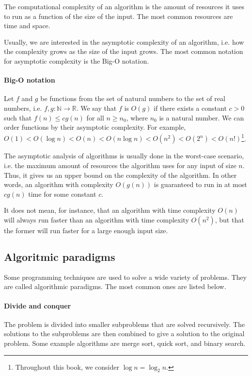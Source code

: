 The computational complexity of an algorithm is the amount of resources it uses to
run as a function of the size of the input.  The most common resources are time and
space.

Usually, we are interested in the asymptotic complexity of an algorithm, i.e. how
the complexity grows as the size of the input grows.  The most common notation for
asymptotic complexity is the Big-O notation.

\paragraph{Big-O notation}  Let $f$ and $g$ be functions from the set of natural numbers
to the set of real numbers, i.e. $f, g : \mathbb{N} \rightarrow \mathbb{R}$.  We say that $f$ is
$O(g)$ if there exists a constant $c > 0$ such that $f(n) \leq c g(n)$ for all $n \geq
n_0$, where $n_0$ is a natural number.
We can order functions by their asymptotic complexity.  For example, $O(1) < O(\log n) <
O(n) < O(n \log n) < O(n^2) < O(2^n) < O(n!)$\footnote{Throughout this book, we consider
$\log n = \log_2 n$.}.

The asymptotic analysis of algorithms is usually done in the worst-case scenario, i.e.
the maximum amount of resources the algorithm uses for any input of size $n$.  Thus,
it gives us an upper bound on the complexity of the algorithm.  In other words, an
algorithm with complexity $O(g(n))$ is guaranteed to run in at most $c g(n)$ time for some
constant $c$.

It does not mean, for instance, that an algorithm with time complexity $O(n)$ will always run
faster than an algorithm with time complexity $O(n^2)$, but that the former will run faster
for a large enough input size.

\subsection{Algoritmic paradigms}

Some programming techniques are used to solve a wide variety of problems.  They are called
algorithmic paradigms.  The most common ones are listed below.

\paragraph{Divide and conquer}  The problem is divided into smaller subproblems that are
solved recursively.  The solutions to the subproblems are then combined to give a solution
to the original problem.  Some example algorithms are merge sort, quick sort, and binary
search.

